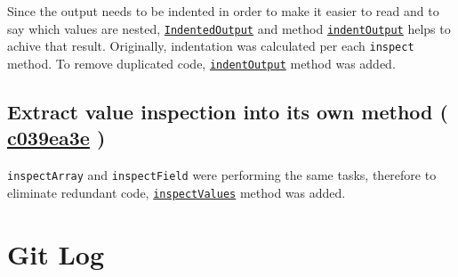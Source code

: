 \documentclass{article}
\newcommand{\code}[1]{\texttt{#1}}
\newcommand{\gh}[1]{%
  \href{https://github.com/awave1/ObjectInspector/commit/#1}{#1}%
}
\begin{document}
Since the output needs to be indented in order to make it easier to read and to say which values are nested, \href{https://github.com/awave1/ObjectInspector/blob/master/src/main/java/utils/IndentedOutput.java}{\code{IndentedOutput}} and method \href{https://github.com/awave1/ObjectInspector/blob/master/src/main/java/inspector/Inspector.java#L199}{\code{indentOutput}} helps to achive that result. Originally, indentation was calculated per each \code{inspect} method. To remove duplicated code, \href{https://github.com/awave1/ObjectInspector/blob/master/src/main/java/inspector/Inspector.java#L199}{\code{indentOutput}} method was added.

\subsection*{Extract value inspection into its own method (\gh{c039ea3e})}

\code{inspectArray} and \code{inspectField} were performing the same tasks, therefore to eliminate redundant code, \href{https://github.com/awave1/ObjectInspector/blob/master/src/main/java/inspector/Inspector.java#L181}{\code{inspectValues}} method was added.

\section*{Git Log}

\end{document}
